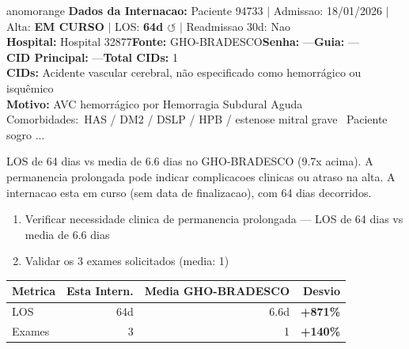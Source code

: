 \documentclass[a4paper,10pt]{article}
\begin{document}
\begin{anomalycard}[Internacao 113795 | GHO-BRADESCO | ALTO (z=3.57)]{anomorange}
\textbf{Dados da Internacao:} Paciente 94733 $\mid$ Admissao: 18/01/2026 $\mid$ Alta: \textcolor{anomorange}{\textbf{EM CURSO}} $\mid$ LOS: \textbf{64d \textcolor{anomorange}{$\circlearrowleft$}} $\mid$ Readmissao 30d: Nao\\
\textbf{Hospital:} Hospital 32877\quad\textbf{Fonte:} GHO-BRADESCO\quad\textbf{Senha:} ---\quad\textbf{Guia:} ---\\
\textbf{CID Principal:} {\small ---}\quad\textbf{Total CIDs:} 1\\

\textbf{CIDs:} {\scriptsize Acidente vascular cerebral, não especificado como hemorrágico ou isquêmico}\\

\textbf{Motivo:} {\scriptsize AVC hemorrágico por Hemorragia Subdural Aguda   Comorbidades: HAS / DM2 / DSLP / HPB / estenose mitral grave   Paciente sogro ...}\\

\vspace{2pt}\begin{tcolorbox}[colback=severityred!20,colframe=anomorange,title={\textbf{Interpretacao de Negocio}},fonttitle=\bfseries\small,left=4pt,right=4pt,top=3pt,bottom=3pt]
{\small LOS de 64 dias vs media de 6.6 dias no GHO-BRADESCO (9.7x acima). A permanencia prolongada pode indicar complicacoes clinicas ou atraso na alta. A internacao esta em curso (sem data de finalizacao), com 64 dias decorridos.}
\end{tcolorbox}
\begin{tcolorbox}[colback=severityyellow!30,colframe=anomorange,title={\textbf{Recomendacoes Especificas}},fonttitle=\bfseries\small,left=4pt,right=4pt,top=3pt,bottom=3pt]
\begin{enumerate}[nosep,leftmargin=16pt]
\item {\small Verificar necessidade clinica de permanencia prolongada --- LOS de 64 dias vs media de 6.6 dias}
\item {\small Validar os 3 exames solicitados (media: 1)}
\end{enumerate}
\end{tcolorbox}
\begin{center}\begin{tabular}{l r r r}\toprule\textbf{Metrica} & \textbf{Esta Intern.} & \textbf{Media GHO-BRADESCO} & \textbf{Desvio} \\\midrule
LOS & 64d & 6.6d & \textcolor{anomred}{\textbf{+871\%}} \\
Exames & 3 & 1 & \textcolor{anomred}{\textbf{+140\%}} \\
\bottomrule\end{tabular}\end{center}


\end{anomalycard}
\end{document}
